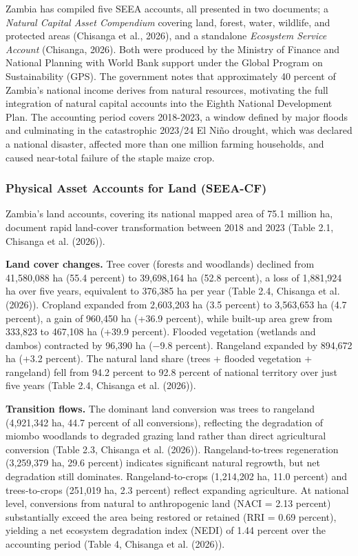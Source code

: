 \documentclass[
  letterpaper,
  DIV=11,
  numbers=noendperiod]{scrartcl}
\begin{document}
Zambia has compiled five SEEA accounts, all presented in two documents;
a \emph{Natural Capital Asset Compendium} covering land, forest, water,
wildlife, and protected areas (Chisanga et al., 2026), and a standalone
\emph{Ecosystem Service Account} (Chisanga, 2026). Both were produced by
the Ministry of Finance and National Planning with World Bank support
under the Global Program on Sustainability (GPS). The government notes
that approximately 40 percent of Zambia's national income derives from
natural resources, motivating the full integration of natural capital
accounts into the Eighth National Development Plan. The accounting
period covers 2018-2023, a window defined by major floods and
culminating in the catastrophic 2023/24 El Niño drought, which was
declared a national disaster, affected more than one million farming
households, and caused near-total failure of the staple maize crop.

\subsubsection{Physical Asset Accounts for Land
(SEEA-CF)}\label{physical-asset-accounts-for-land-seea-cf-2}

Zambia's land accounts, covering its national mapped area of 75.1
million ha, document rapid land-cover transformation between 2018 and
2023 (Table 2.1, Chisanga et al. (2026)).

\textbf{Land cover changes.} Tree cover (forests and woodlands) declined
from 41,580,088 ha (55.4 percent) to 39,698,164 ha (52.8 percent), a
loss of 1,881,924 ha over five years, equivalent to 376,385 ha per year
(Table 2.4, Chisanga et al. (2026)). Cropland expanded from 2,603,203 ha
(3.5 percent) to 3,563,653 ha (4.7 percent), a gain of 960,450 ha (+36.9
percent), while built-up area grew from 333,823 to 467,108 ha (+39.9
percent). Flooded vegetation (wetlands and dambos) contracted by 96,390
ha (−9.8 percent). Rangeland expanded by 894,672 ha (+3.2 percent). The
natural land share (trees + flooded vegetation + rangeland) fell from
94.2 percent to 92.8 percent of national territory over just five years
(Table 2.4, Chisanga et al. (2026)).

\textbf{Transition flows.} The dominant land conversion was trees to
rangeland (4,921,342 ha, 44.7 percent of all conversions), reflecting
the degradation of miombo woodlands to degraded grazing land rather than
direct agricultural conversion (Table 2.3, Chisanga et al. (2026)).
Rangeland-to-trees regeneration (3,259,379 ha, 29.6 percent) indicates
significant natural regrowth, but net degradation still dominates.
Rangeland-to-crops (1,214,202 ha, 11.0 percent) and trees-to-crops
(251,019 ha, 2.3 percent) reflect expanding agriculture. At national
level, conversions from natural to anthropogenic land (NACI = 2.13
percent) substantially exceed the area being restored or retained (RRI =
0.69 percent), yielding a net ecosystem degradation index (NEDI) of 1.44
percent over the accounting period (Table 4, Chisanga et al. (2026)).
\end{document}
